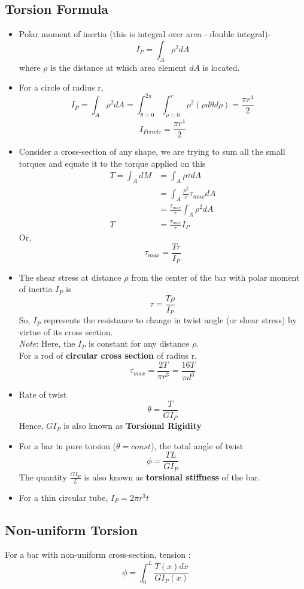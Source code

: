\documentclass{article}
\begin{document}
	\subsection{Torsion Formula}
	\begin{itemize}
		\item Polar moment of inertia (this is integral over area - double integral)-
		\[\boxed{I_P = \int_A \rho^2 dA}\]
		where $\rho$ is the distance at which area element $dA$ is located.
		\item For a circle of radius r, 
		\[I_P = \int_A \rho^2 dA = \int_{\theta = 0}^{2\pi}\int_{\rho = 0}^r \rho^2 (\rho d\theta d\rho) = \frac{\pi r^4}{2} \]
		\[I_{Pcircle} = \frac{\pi r^4}{2}\]
		\item Consider a cross-section of any shape, we are trying to sum all the small torques and equate it to the torque applied on this
		\begin{align*}
			T = \int_A dM &= \int_A \rho \tau dA\\
						  &= \int_A \frac{\rho^2}{r}\tau_{max} dA\\
						  &= \frac{\tau_{max}}{r} \int_A \rho^2 dA\\
						T &= \frac{\tau_{max}}{r} I_P
		\end{align*}
		Or,
		\[\tau_{max} = \frac{Tr}{I_P}\]
		\item The shear stress at distance $\rho$ from the center of the bar with polar moment of inertia $I_P$ is
		\[\boxed{\tau = \frac{T\rho}{I_P}}\]
		So, $I_P$ represents the resistance to change in twist angle (or shear stress) by virtue of its cross section.\\
		\emph{Note}: Here, the $I_P$ is constant for any distance $\rho$.\\
		For a rod of \textbf{circular cross section} of radius r,
		\[\boxed{\tau_{max} = \frac{2T}{\pi r^3} = \frac{16T}{\pi d^3 }}\]

		\item Rate of twist
		\[\boxed{\theta = \frac{T}{GI_P}}\]
		Hence, $GI_P$ is also known as \textbf{Torsional Rigidity}
		\item For a bar in pure torsion ($\theta = const$), the total angle of twist
		\[\boxed{\phi = \frac{TL}{GI_P}}\]
		The quantity $\frac{G I_P}{L}$ is also known as \textbf{torsional stiffness} of the bar.

		\item For a thin circular tube, $I_P = 2 \pi r^3 t$
	\end{itemize}

	\subsection{Non-uniform Torsion}
		For a bar with non-uniform cross-section, tension  :
		\[\boxed{\phi = \int_0^L \frac{T(x) dx}{G I_P(x)}}\]
\end{document}
